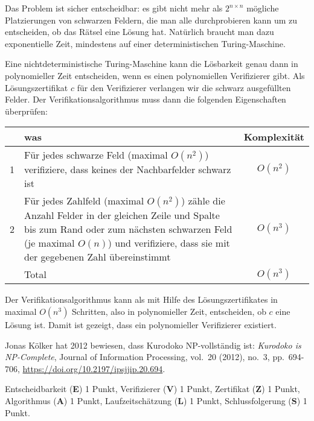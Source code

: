 
\begin{loesung}
Das Problem ist sicher entscheidbar: es gibt nicht mehr als $2^{n\times n}$
mögliche Platzierungen von schwarzen Feldern, die man alle durchprobieren
kann um zu entscheiden, ob das Rätsel eine Lösung hat. 
Natürlich braucht man dazu exponentielle Zeit, mindestens auf einer 
deterministischen Turing-Maschine.

Eine nichtdeterministische Turing-Maschine kann die Lösbarkeit
genau dann in polynomieller Zeit entscheiden,
wenn es einen polynomiellen Verifizierer gibt.
Als Lösungszertifikat $c$ für den Verifizierer verlangen wir die schwarz
ausgefüllten Felder.
Der Verifikationsalgorithmus muss dann die folgenden Eigenschaften überprüfen:
\begin{center}
\begin{tabular}{r|p{10cm}|c}
&was&Komplexität\\
\hline
1&Für jedes schwarze Feld (maximal $O(n^2)$) verifiziere, dass keines der Nachbarfelder
schwarz ist&$O(n^2)$\\
2&Für jedes Zahlfeld (maximal $O(n^2)$)
zähle die Anzahl Felder in der gleichen Zeile
und Spalte bis zum Rand oder zum nächsten schwarzen Feld (je
maximal $O(n)$) und
verifiziere, dass sie mit der gegebenen Zahl übereinstimmt&$O(n^3)$\\
\hline
&Total&$O(n^3)$
\end{tabular}
\end{center}
Der Verifikationsalgorithmus kann als mit Hilfe des Lösungszertifikates in
maximal $O(n^3)$ Schritten, also in polynomieller Zeit, entscheiden,
ob $c$ eine Lösung ist.
Damit ist gezeigt, dass ein polynomieller Verifizierer existiert.
\end{loesung}

\begin{diskussion}
Jonas Kölker hat 2012 bewiesen, dass Kurodoko NP-vollständig ist:
{\em Kurodoko is NP-Complete}, Journal of Information Processing,
vol.~20 (2012), no.~3, pp.~694-706,
\url{https://doi.org/10.2197/ipsjjip.20.694}.
\end{diskussion}

\begin{bewertung}
Entscheidbarkeit ({\bf E}) 1 Punkt,
Verifizierer ({\bf V}) 1 Punkt,
Zertifikat ({\bf Z}) 1 Punkt,
Algorithmus ({\bf A}) 1 Punkt,
Laufzeitschätzung ({\bf L}) 1 Punkt,
Schlussfolgerung ({\bf S}) 1 Punkt.
\end{bewertung}

